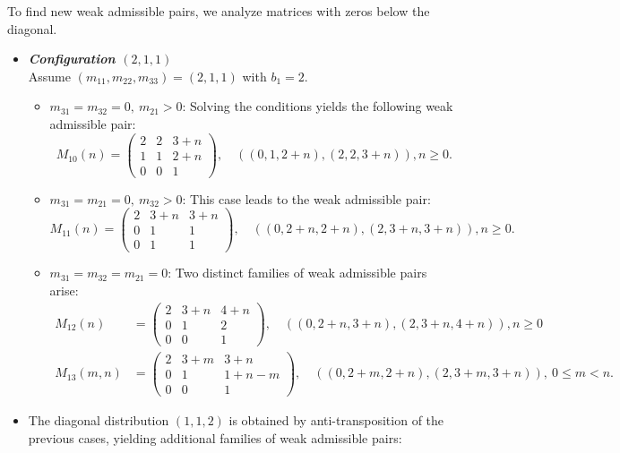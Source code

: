 \documentclass[12pt,reqno]{amsart}
\theoremstyle{plain}
\theoremstyle{definition}
\theoremstyle{remark}
\theoremstyle{definition}
\begin{document}
To find new weak admissible pairs, we analyze matrices with zeros below the diagonal.

\begin{itemize}
    \item \textit{\textbf{Configuration $(2, 1, 1)$}}\\
Assume $(m_{11}, m_{22}, m_{33}) = (2, 1, 1)$ with $b_1 = 2$.

\begin{itemize}
    \item \textbf{$m_{31} = m_{32} = 0,\ m_{21} > 0$}: Solving the conditions yields the following weak admissible pair:
    \[
    M_{10}(n) = \begin{pmatrix}2 & 2 & 3 + n\\ 1 & 1 & 2 + n\\ 0 & 0 & 1\end{pmatrix},\quad ((0, 1, 2 + n),(2, 2, 3 + n)), n\geq 0.
    \]
    
    \item \textbf{$m_{31} = m_{21} = 0,\ m_{32} > 0$}: This case leads to the weak admissible pair:
    \[
    M_{11}(n) = \begin{pmatrix}2 & 3 + n & 3 + n\\ 0 & 1 & 1\\ 0 & 1 & 1\end{pmatrix},\quad ((0, 2 + n, 2 + n),(2, 3 + n, 3 + n)), n\geq 0.
    \]
    
    \item \textbf{$m_{31} = m_{32} = m_{21} = 0$}: Two distinct families of weak admissible pairs arise:
    \begin{align*}
    M_{12}(n) &= \begin{pmatrix}2 & 3 + n & 4 + n\\ 0 & 1 & 2 \\ 0 & 0 & 1\end{pmatrix},\quad ((0, 2 + n, 3 + n), (2, 3 + n, 4 + n)), n\geq 0\\
    M_{13}(m, n) &= \begin{pmatrix}2 & 3 + m & 3 + n\\ 0 & 1 & 1 + n - m\\ 0 & 0 & 1\end{pmatrix},\quad ((0, 2 + m, 2 + n), (2, 3 + m, 3 + n)),\ 0\leq m < n.
    \end{align*}
\end{itemize}

\item The diagonal distribution $(1, 1, 2)$ is obtained by anti-transposition of the previous cases, yielding additional families of weak admissible pairs:


\end{itemize}
\end{document}
